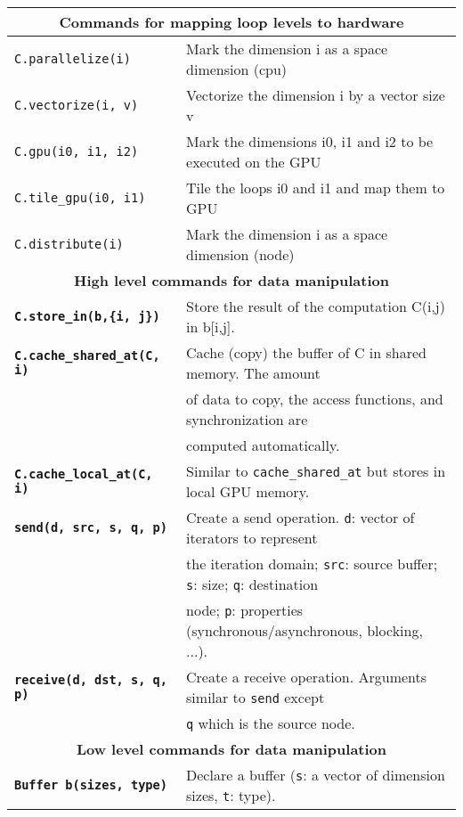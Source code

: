\begin{table}[t]
\begin{tabular}{l|l}
        \multicolumn{2}{c}{\textbf{Commands for mapping loop levels to hardware}} \\\hline
        \texttt{C.parallelize(i)} & Mark the dimension i as a space dimension (cpu)\\\hline
        \texttt{C.vectorize(i, v)} & Vectorize the dimension i by a vector size v\\\hline
        \texttt{C.gpu(i0, i1, i2)} & Mark the dimensions i0, i1 and i2 to be executed on the GPU \\\hline
        \texttt{C.tile\_gpu(i0, i1)} & Tile the loops i0 and i1 and map them to GPU \\\hline
        \texttt{C.distribute(i)} & Mark the dimension i as a space dimension (node)\\\hline
        \multicolumn{2}{c}{\textbf{High level commands for data manipulation}} \\\hline
        \texttt{\textbf{C.store\_in(b,\{i, j\})}} & Store the result of the computation C(i,j) in b[i,j].\\\hline
        \texttt{\textbf{C.cache\_shared\_at(C, i)}} & Cache (copy) the buffer of C in shared memory. The amount\\
        & of data to copy, the access functions, and synchronization are\\
        & computed automatically.\\\hline
        \texttt{\textbf{C.cache\_local\_at(C, i)}} & Similar to \texttt{cache\_shared\_at} but stores in local GPU memory.\\\hline
        \texttt{\textbf{send(d, src, s, q, p)}}
            & Create a send operation. \texttt{d}: vector of iterators to represent \\
            &  the iteration domain; \texttt{src}: source buffer; \texttt{s}: size; \texttt{q}: destination \\
            & node; \texttt{p}: properties (synchronous/asynchronous, blocking, ...).
        \\\hline
        \texttt{\textbf{receive(d, dst, s, q, p)}}
            & Create a receive operation. Arguments similar to \texttt{send} except\\
            &\texttt{q} which is the source node.
        \\\hline
        \multicolumn{2}{c}{\textbf{Low level commands for data manipulation}}\\\hline
        \texttt{\textbf{Buffer b(sizes, type)}} & Declare a buffer (\texttt{s}: a vector of dimension sizes, \texttt{t}: type). \\\hline

\end{tabular}
\end{table}
